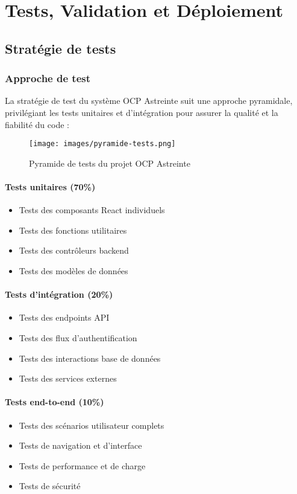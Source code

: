 \chapter{Tests, Validation et Déploiement}

\section{Stratégie de tests}
\subsection{Approche de test}
La stratégie de test du système OCP Astreinte suit une approche pyramidale, privilégiant les tests unitaires et d'intégration pour assurer la qualité et la fiabilité du code :

\begin{figure}[h]
\centering
\texttt{[image: images/pyramide-tests.png]}
\caption{Pyramide de tests du projet OCP Astreinte}
\label{fig:pyramide-tests}
\end{figure}

\subsubsection{Tests unitaires (70\%)}
\begin{itemize}
    \item Tests des composants React individuels
    \item Tests des fonctions utilitaires
    \item Tests des contrôleurs backend
    \item Tests des modèles de données
\end{itemize}

\subsubsection{Tests d'intégration (20\%)}
\begin{itemize}
    \item Tests des endpoints API
    \item Tests des flux d'authentification
    \item Tests des interactions base de données
    \item Tests des services externes
\end{itemize}

\subsubsection{Tests end-to-end (10\%)}
\begin{itemize}
    \item Tests des scénarios utilisateur complets
    \item Tests de navigation et d'interface
    \item Tests de performance et de charge
    \item Tests de sécurité
\end{itemize}


